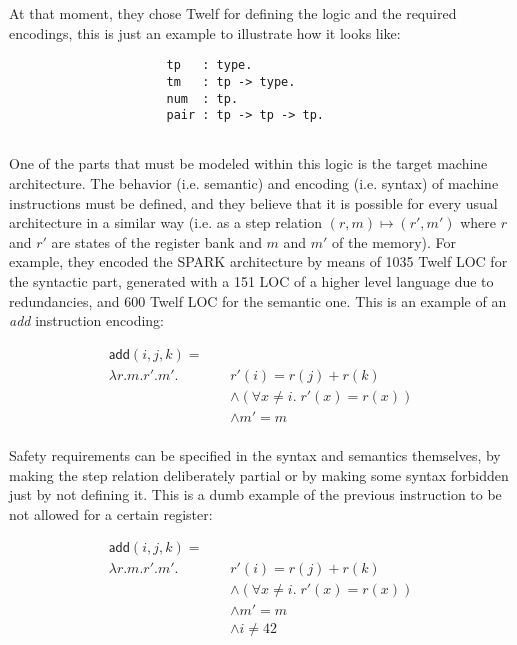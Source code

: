\documentclass{article}
\begin{document}
At that moment, they chose Twelf for defining the logic and
the required encodings, this is just an example to 
illustrate how it looks like:

\begin{verbatim}
                      tp   : type.
                      tm   : tp -> type.
                      num  : tp.
                      pair : tp -> tp -> tp.
                      
\end{verbatim}

One of the parts that must be modeled within this logic is 
the target machine architecture. The behavior (i.e. 
semantic) and encoding (i.e. syntax) of machine 
instructions must be defined, and they believe that it is
possible for every usual architecture in a similar way 
(i.e. as a step relation $(r,m) \mapsto (r',m')$ where $r$ 
and $r'$ are states of the register bank and $m$ and $m'$ 
of the memory). For example, they encoded the SPARK 
architecture by means of 1035 Twelf LOC for the syntactic 
part, generated with a 151 LOC of a higher level language 
due to redundancies, and 600 Twelf LOC for the semantic 
one. This is an example of an \textit{add} instruction 
encoding:

\begin{align*}
  \mathsf{add}(i, j, k) = \;\;\;\;&\\ 
    \lambda r.m.r'.m'.\;&r'(i) = r(j) + r(k) \\
      &\land (\forall x \neq i.\;r'(x) = r(x)) \\
      &\land m' = m \\
\end{align*}

Safety requirements can be specified in the syntax and 
semantics themselves, by making the step relation 
deliberately partial or by making some syntax forbidden 
just by not defining it. This is a dumb example of the 
previous instruction to be not allowed for a certain 
register:

\begin{align*}
  \mathsf{add}(i, j, k) = \;\;\;\;&\\ 
    \lambda r.m.r'.m'.\;&r'(i) = r(j) + r(k) \\
      &\land (\forall x \neq i.\;r'(x) = r(x)) \\
      &\land m' = m \\
      &\land i \neq 42 \\
\end{align*}
\end{document}
